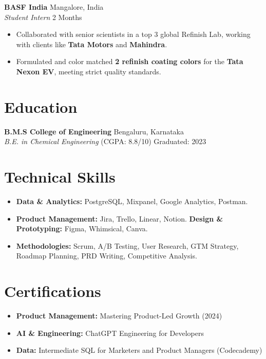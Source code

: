 \documentclass[a4paper,10pt]{article}
\begin{document}
\vspace{6pt}
\noindent \textbf{BASF India} \hfill Mangalore, India \\
\textit{Student Intern} \hfill 2 Months
\begin{itemize}[noitemsep,topsep=0pt,leftmargin=*]
    \item Collaborated with senior scientists in a top 3 global Refinish Lab, working with clients like \textbf{Tata Motors} and \textbf{Mahindra}.
    \item Formulated and color matched \textbf{2 refinish coating colors} for the \textbf{Tata Nexon EV}, meeting strict quality standards.
\end{itemize}
\section{Education}
\noindent \textbf{B.M.S College of Engineering} \hfill Bengaluru, Karnataka \\
\textit{B.E. in Chemical Engineering} (CGPA: 8.8/10) \hfill Graduated: 2023
\section{Technical Skills}
\begin{itemize}[noitemsep,topsep=0pt,leftmargin=*]
    \item \textbf{Data \& Analytics:} PostgreSQL, Mixpanel, Google Analytics, Postman.
    \item \textbf{Product Management:} Jira, Trello, Linear, Notion.
    \textbf{Design \& Prototyping:} Figma, Whimsical, Canva.
    \item \textbf{Methodologies:} Scrum, A/B Testing, User Research, GTM Strategy, Roadmap Planning, PRD Writing, Competitive Analysis.
\end{itemize}
\section{Certifications}
\begin{itemize}[noitemsep,topsep=0pt,leftmargin=*]
    \item \textbf{Product Management:} Mastering Product-Led Growth (2024)
    \item \textbf{AI \& Engineering:} ChatGPT Engineering for Developers
    \item \textbf{Data:} Intermediate SQL for Marketers and Product Managers (Codecademy)
\end{itemize}
\end{document}
